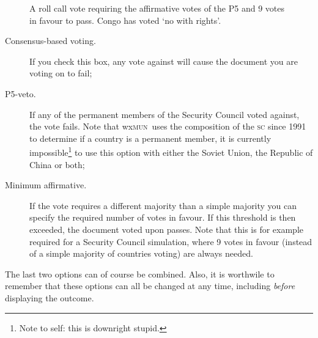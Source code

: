 \documentclass[11pt, a4paper]{article}
\newcommand\wxMUN{wx\textsc{mun}}
\begin{document}
\begin{figure}[tbp]
\centering
{}
\caption{A roll call vote requiring the affirmative votes of the P5 and 9 votes in favour to pass. Congo has voted `no with rights'.}
\label{fig:sub} %
\end{figure}

\begin{description}
\item[Consensus-based voting.] If you check this box, any vote against will cause the document you are voting on to fail;
\item[P5-veto.] If any of the permanent members of the Security Council voted against, the vote fails. Note that \wxMUN\ uses the composition of the \textsc{sc} since 1991 to determine if a country is a permanent member, it is currently impossible\footnote{Note to self: this is downright stupid.} to use this option with either the Soviet Union, the Republic of China or both;
\item[Minimum affirmative.] If the vote requires a different majority than a simple majority you can specify the required number of votes in favour. If this threshold is then exceeded, the document voted upon passes. Note that this is for example required for a Security Council simulation, where 9 votes in favour (instead of a simple majority of countries voting) are always needed.
\end{description}
The last two options can of course be combined. Also, it is worthwile to remember that these options can all be changed at any time, including \emph{before} displaying the outcome.
\end{document}

